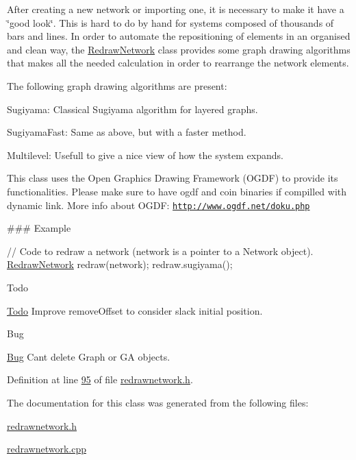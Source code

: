 After creating a new network or importing one, it is necessary to make it have a \char`\"{}good look\char`\"{}. This is hard to do by hand for systems composed of thousands of bars and lines. In order to automate the repositioning of elements in an organised and clean way, the \hyperlink{class_redraw_network}{Redraw\+Network} class provides some graph drawing algorithms that makes all the needed calculation in order to rearrange the network elements.

The following graph drawing algorithms are present\+:
\begin{DoxyItemize}
\item Sugiyama\+: Classical Sugiyama algorithm for layered graphs.
\item Sugiyama\+Fast\+: Same as above, but with a faster method.
\item Multilevel\+: Usefull to give a nice view of how the system expands.
\end{DoxyItemize}

This class uses the Open Graphics Drawing Framework (O\+G\+D\+F) to provide its functionalities. Please make sure to have ogdf and coin binaries if compilled with dynamic link. More info about O\+G\+D\+F\+: \href{http://www.ogdf.net/doku.php}{\tt http\+://www.\+ogdf.\+net/doku.\+php}

\#\#\# Example 
\begin{DoxyCode}
\textcolor{comment}{// Code to redraw a network (network is a pointer to a Network object).}
 \hyperlink{class_redraw_network}{RedrawNetwork} redraw(network);
 redraw.sugiyama();
\end{DoxyCode}


\begin{DoxyRefDesc}{Todo}
\item[\hyperlink{todo__todo000001}{Todo}]Improve remove\+Offset to consider slack initial position. \end{DoxyRefDesc}
\begin{DoxyRefDesc}{Bug}
\item[\hyperlink{bug__bug000001}{Bug}]Can\textquotesingle{}t delete Graph or G\+A objects.\end{DoxyRefDesc}


Definition at line \hyperlink{redrawnetwork_8h_source_l00095}{95} of file \hyperlink{redrawnetwork_8h_source}{redrawnetwork.\+h}.



The documentation for this class was generated from the following files\+:\begin{DoxyCompactItemize}
\item 
\hyperlink{redrawnetwork_8h}{redrawnetwork.\+h}\item 
\hyperlink{redrawnetwork_8cpp}{redrawnetwork.\+cpp}\end{DoxyCompactItemize}
